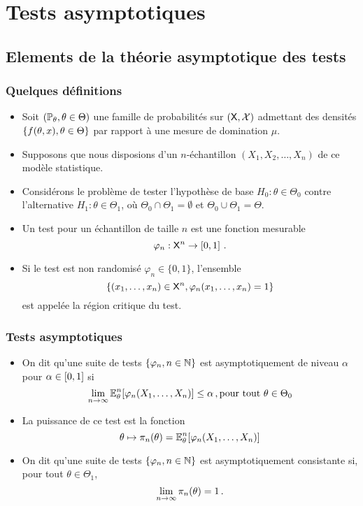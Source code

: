 \section{Tests asymptotiques}
\subsection{Elements de la théorie asymptotique des tests}
\begin{frame}
\frametitle{Quelques définitions}
\begin{itemize}
\item Soit $(\operatorname{{\mathbb P}}_\theta, \theta \in \Theta)$ une famille de probabilités sur $(\mathsf{X},\mathcal{X})$ admettant des densités $\{ f(\theta,x), \theta \in \Theta \}$ par rapport à une mesure de domination $\mu$.
\item Supposons que nous disposions d'un $n$-échantillon $(X_1,X_2,\dots, X_n)$ de ce modèle statistique.
\item Considérons le problème de tester l'hypothèse de base $H_0: \theta \in \Theta_0$ contre l'alternative $H_1: \theta \in \Theta_1$, où $\Theta_0 \cap \Theta_1= \emptyset$ et $\Theta_0 \cup \Theta_1= \Theta$.
\item Un \alert{test} pour un échantillon de taille $n$ est une  fonction mesurable
\[
\varphi_n : \mathsf{X}^n \to \left[0,1\right] \,.
\]
\item Si le test est \alert{non randomisé} $\varphi_n \in \{0,1\}$, l'ensemble
\[
\{ (x_1,\dots, x_n) \in \mathsf{X}^n, \varphi_n(x_1,\dots,x_n)= 1\}
\]
est appelée la \alert{région critique du test}.
\end{itemize}
\end{frame}

\begin{frame}
\frametitle{Tests asymptotiques}
\begin{itemize}
\item  On dit qu'une suite de  tests $\{\varphi_n, n \in \mathbb{N}\}$ est \alert{asymptotiquement de niveau $\alpha$} pour $\alpha \in \left[0,1\right]$ si
\alert{
\[
\lim_{n \to \infty} \operatorname{{\mathbb E}}^n_\theta[ \varphi_n(X_1,\dots,X_n)] \leq \alpha \,, \text{pour tout $\theta \in \Theta_0$}
\]
}
\item La puissance de ce test est la fonction
\[
\theta \mapsto \pi_n(\theta)= \operatorname{{\mathbb E}}^n_{\theta}[ \varphi_n(X_1,\dots,X_n)]
\]
\item On dit qu'une suite de tests $\{\varphi_n, n \in \mathbb{N}\}$ est asymptotiquement \alert{consistante} si, pour tout $\theta \in \Theta_1$,
\alert{
\[
\lim_{n \to \infty} \pi_n(\theta) = 1 \,.
\]
}
\end{itemize}
\end{frame}

